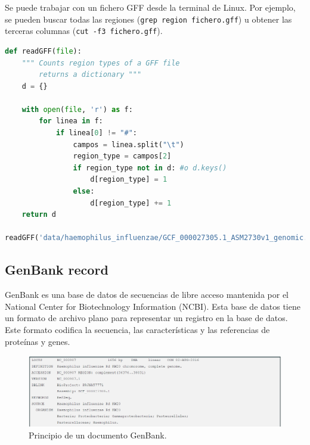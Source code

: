 Se puede trabajar con un fichero GFF desde la terminal de Linux. Por ejemplo, se pueden buscar todas las regiones (\texttt{grep region fichero.gff}) u obtener las terceras columnas (\texttt{cut -f3 fichero.gff}).

\begin{lstlisting}[language=Python]
def readGFF(file):
    """ Counts region types of a GFF file 
        returns a dictionary """  
    d = {}
    
    with open(file, 'r') as f:
        for linea in f:
            if linea[0] != "#": 
                campos = linea.split("\t")
                region_type = campos[2]
                if region_type not in d: #o d.keys()
                    d[region_type] = 1
                else:
                    d[region_type] += 1
    return d

readGFF('data/haemophilus_influenzae/GCF_000027305.1_ASM2730v1_genomic.gff')
\end{lstlisting}

\subsection{GenBank record}
GenBank es una base de datos de secuencias de libre acceso mantenida por el National Center for Biotechnology Information (NCBI). Esta base de datos tiene un formato de archivo plano para representar un registro en la base de datos. Este formato codifica la secuencia, las características y las referencias de proteínas y genes.

\begin{figure}[htbp]
\centering
\includegraphics[width = \textwidth]{figs/genbank.png}
\caption{Principio de un documento GenBank.}
\label{fig:genbank}
\end{figure}

